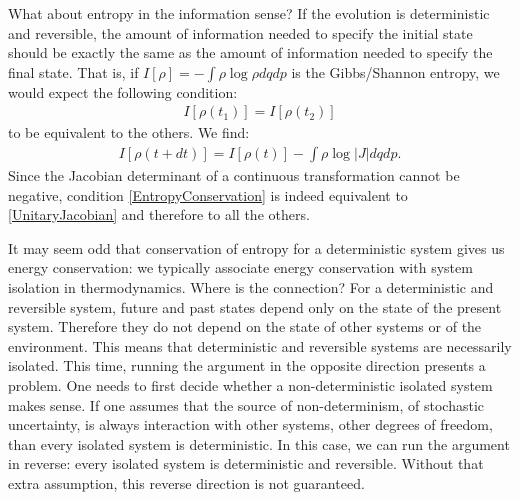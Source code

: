 \documentclass[10pt,twocolumn, nofootinbib]{revtex4-2}
\begin{document}
What about entropy in the information sense? If the evolution is deterministic and reversible, the amount of information needed to specify the initial state should be exactly the same as the amount of information needed to specify the final state. That is, if $I[\rho] = - \int \rho \log \rho dqdp$ is the Gibbs/Shannon entropy, we would expect the following condition:
\begin{align}\label{EntropyConservation}
	I[\rho(t_1)] = I[\rho(t_2)]
\end{align}
to be equivalent to the others. We find:
\begin{align}
	I[\rho(t + dt)] = I[\rho(t)] - \int \rho \log |J| dqdp.
\end{align}
Since the Jacobian determinant of a continuous transformation cannot be negative, condition \eqref{EntropyConservation} is indeed equivalent to \eqref{UnitaryJacobian} and therefore to all the others.

It may seem odd that conservation of entropy for a deterministic system gives us energy conservation: we typically associate energy conservation with system isolation in thermodynamics. Where is the connection? For a deterministic and reversible system, future and past states depend only on the state of the present system. Therefore they do not depend on the state of other systems or of the environment. This means that deterministic and reversible systems are necessarily isolated. This time, running the argument in the opposite direction presents a problem. One needs to first decide whether a non-deterministic isolated system makes sense. If one assumes that the source of non-determinism, of stochastic uncertainty, is always interaction with other systems, other degrees of freedom, than every isolated system is deterministic. In this case, we can run the argument in reverse: every isolated system is deterministic and reversible. Without that extra assumption, this reverse direction is not guaranteed.
\end{document}
